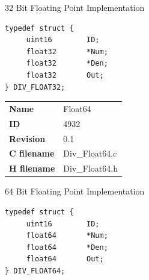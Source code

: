 32 Bit Floating Point Implementation

\begin{lstlisting}
typedef struct {
     uint16        ID;
     float32       *Num;
     float32       *Den;
     float32       Out;
} DIV_FLOAT32;
\end{lstlisting}

\ifdefined \AddTestReports
{}
\fi
{}
\nopagebreak[0]
\begin{tabular}{l l}
\textbf{Name} & Float64 \tabularnewline
\textbf{ID} & 4932 \tabularnewline
\textbf{Revision} & 0.1 \tabularnewline
\textbf{C filename} & Div\_Float64.c \tabularnewline
\textbf{H filename} & Div\_Float64.h \tabularnewline
\end{tabular}
\vspace{1ex}

64 Bit Floating Point Implementation

\begin{lstlisting}
typedef struct {
     uint16        ID;
     float64       *Num;
     float64       *Den;
     float64       Out;
} DIV_FLOAT64;
\end{lstlisting}

\ifdefined \AddTestReports
{}
\fi
